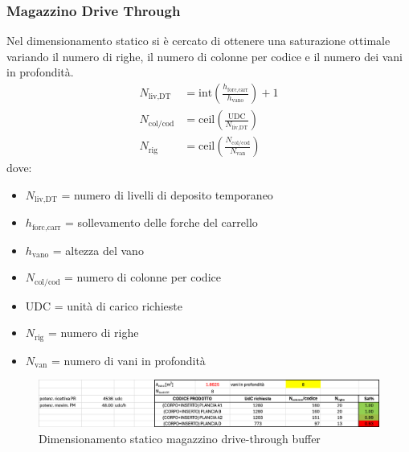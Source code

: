 \documentclass[11pt]{article}
\begin{document}
\subsubsection{Magazzino Drive Through}
Nel dimensionamento statico si è cercato di ottenere una saturazione ottimale variando il numero di righe, il numero di colonne per codice e il numero dei vani in profondità.
\begin{align}
    N_{\text{liv,DT}} &= \text{int}\left(\frac{h_{\text{forc,carr}}}{h_{\text{vano}}}\right) + 1 \\
    N_{\text{col/cod}} &= \text{ceil}\left(\frac{\text{UDC}}{N_{\text{liv,DT}}}\right) \\
    N_{\text{rig}} &= \text{ceil}\left(\frac{N_{\text{col/cod}}}{N_{\text{van}}}\right)
\end{align}
dove:
\begin{itemize}
    \item $N_{\text{liv,DT}}$ = numero di livelli di deposito temporaneo
    \item $h_{\text{forc,carr}}$ = sollevamento delle forche del carrello
    \item $h_{\text{vano}}$ = altezza del vano
    \item $N_{\text{col/cod}}$ = numero di colonne per codice
    \item $\text{UDC}$ = unità di carico richieste
    \item $N_{\text{rig}}$ = numero di righe
    \item $N_{\text{van}}$ = numero di vani in profondità
\end{itemize}

\begin{figure}[H]
    \centering
    \includegraphics[width=\textwidth]{images/Dimensionamento statico magazzino drive-through BUFFER.png}
    \caption{Dimensionamento statico magazzino drive-through buffer}
    \label{fig: Dimensionamento statico magazzino drive-through BUFFER}
\end{figure}

\newpage
\end{document}
